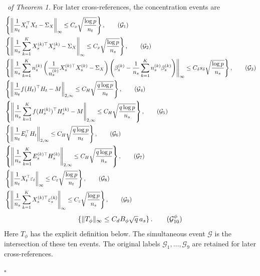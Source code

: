 \documentclass[12pt]{article}
\newenvironment{pf}{{\noindent \it Proof}\ }{\hfill $\square$\par}
\begin{document}
\begin{pf}{\it of Theorem 1.}
For later cross-references, the concentration events are
    \begin{align}
       & \left\{\left\|\frac{1}{n_t} X_t^\top X_t - \Sigma_X\right\|_{\infty} \le C_x\sqrt{\frac{\log p}{n_t}}\right\},\label{set:g_1}\tag{$\mathcal{G}_1$}\\
        &\left\{\left\|\frac{1}{n_s}\sum_{k=1}^K X_s^{(k)\top}X_s^{(k)} - \Sigma_X\right\|_{\infty} \le C_x\sqrt{\frac{\log p}{n_s}}\right\},\label{set:g_2}\tag{$\mathcal{G}_2$} \\
        & \left\{ \left\|\frac{1}{n_s}\sum_{k=1}^K n_s^{(k)}\left(\frac{1}{n_s^{(k)}}X_s^{(k)\top}X_s^{(k)} - \Sigma_X \right)\left(\beta_s^{(k)} - \frac{1}{n_s}\sum_{k=1}^Kn_s^{(k)}\beta_s^{(k)}\right) \right\|_{\infty}\le  C_{\delta} s_\delta\sqrt{\frac{\log p}{n_s}} \right\},
          \label{set:g_3}\tag{$\mathcal{G}_3$}\\&
          \left\{\left\|\frac{1}{n_t}f(H_t)^\top H_t - M\right\|_{2,\infty} \le 
        C_{H} \sqrt{\frac{q \log p}{n_t}}\right\},\label{set:g_4}\tag{$\mathcal{G}_4$}\\&
        \left\{\left\|\frac{1}{n_s}\sum_{k=1}^K f(H_s^{(k)})^\top H_s^{(k)} - M \right\|_{2,\infty} \le
        C_{H} \sqrt{\frac{q \log p}{n_s}}\right\},\label{set:g_5}\tag{$\mathcal{G}_5$}\\& 
        \left\{\left\| \frac{1}{n_t} E_t^\top H_t\right\|_{2,\infty} \le C_H\sqrt{\frac{q\log p}{n_t}}\right\}, \label{set:g_6}\tag{$\mathcal{G}_6$}\\&
        \left\{\left\| \frac{1}{n_s} \sum_{k=1}^K E_s^{(k)\top} H_s^{(k)}\right\|_{2,\infty} \le C_H\sqrt{\frac{q\log p}{n_s}}\right\}, \label{set:g_7}\tag{$\mathcal{G}_7$}\\&
        \left\{\left\|\frac{1}{n_t}X_t^\top \varepsilon_t\right\|_{\infty} \le C_\varepsilon \sqrt{\frac{\log p}{n_t}}\right\}, \label{set:g_8}\tag{$\mathcal{G}_8$}\\&
        \left\{\left\|\frac{1}{n_s}\sum_{k=1}^K X_s^{(k)\top} \varepsilon_s^{(k)}\right\|_{\infty} \le C_\varepsilon \sqrt{\frac{\log p}{n_s}}\right\}, \label{set:g_9}\tag{$\mathcal{G}_9$}
    \end{align}
\begin{equation}
 \left\{\|T_\phi\|_\infty\le C_dB_\phi\sqrt q\,a_s\right\}.
 \label{set:g_10_weighted}\tag{$\mathcal G_{10}^{\phi}$}
\end{equation}
Here $T_\phi$ has the explicit definition below. The simultaneous event
$\mathcal G$ is the intersection of these ten events. The original labels
$\mathcal G_1,\ldots,\mathcal G_9$ are retained for later cross-references.


\end{pf}
\end{document}
